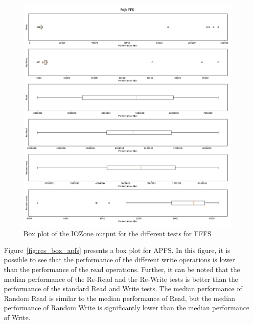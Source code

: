 \begin{figure}[!htb]
	\label{fig:res_box_fffs}
	\begin{center}
		\includegraphics[width=1.0\textwidth]{figures/benchmarking/fake-ffs/Fejk FFS-box.pdf}
	\end{center}
	\caption{Box plot of the IOZone output for the different tests for \gls{FFFS}}
\end{figure}

Figure~\ref{fig:res_box_apfs} presents a box plot for \gls{APFS}. In this figure, it is possible to see that the performance of the different write operations is lower than the performance of the read operations. Further, it can be noted that the median performance of the Re-Read and the Re-Write tests is better than the performance of the standard Read and Write tests. The median performance of Random Read is similar to the median performance of Read, but the median performance of Random Write is significantly lower than the median performance of Write.

